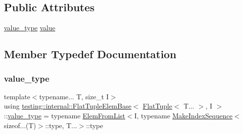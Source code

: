 \subsection*{Public Attributes}
\begin{DoxyCompactItemize}
\item 
\hyperlink{structtesting_1_1internal_1_1FlatTupleElemBase_3_01FlatTuple_3_01T_8_8_8_01_4_00_01I_01_4_a6b87a445f87724f9363b348e6c697766}{value\+\_\+type} \hyperlink{structtesting_1_1internal_1_1FlatTupleElemBase_3_01FlatTuple_3_01T_8_8_8_01_4_00_01I_01_4_ac175518e7807c0b49c0ba8c1c78269ec}{value}
\end{DoxyCompactItemize}


\subsection{Member Typedef Documentation}
\mbox{\label{structtesting_1_1internal_1_1FlatTupleElemBase_3_01FlatTuple_3_01T_8_8_8_01_4_00_01I_01_4_a6b87a445f87724f9363b348e6c697766}} 
\subsubsection{\texorpdfstring{value\+\_\+type}{value\_type}}
{\footnotesize\ttfamily template$<$typename... T, size\+\_\+t I$>$ \\
using \hyperlink{structtesting_1_1internal_1_1FlatTupleElemBase}{testing\+::internal\+::\+Flat\+Tuple\+Elem\+Base}$<$ \hyperlink{classtesting_1_1internal_1_1FlatTuple}{Flat\+Tuple}$<$ T... $>$, I $>$\+::\hyperlink{structtesting_1_1internal_1_1FlatTupleElemBase_3_01FlatTuple_3_01T_8_8_8_01_4_00_01I_01_4_a6b87a445f87724f9363b348e6c697766}{value\+\_\+type} =  typename \hyperlink{structtesting_1_1internal_1_1ElemFromList}{Elem\+From\+List}$<$I, typename \hyperlink{structtesting_1_1internal_1_1MakeIndexSequence}{Make\+Index\+Sequence}$<$sizeof...(T)$>$\+::type, T...$>$\+::type}



